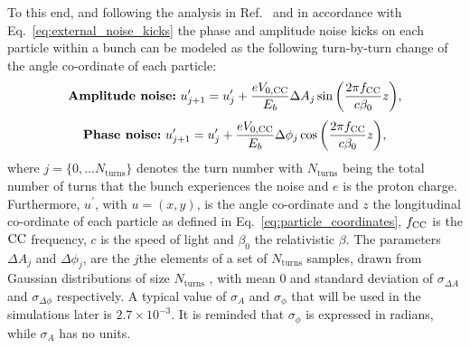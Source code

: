 To this end, and following the analysis in Ref.~\cite{PhysRevSTAB.18.101001} and in accordance with Eq.~\eqref{eq:external_noise_kicks} the phase and amplitude noise kicks on each particle within a bunch can be modeled as the following turn-by-turn change of the angle co-ordinate of each particle: %
\begin{equation}\label{eq:amplitude_noise_kick}
    \textbf{\textrm{Amplitude noise:}} \  u^\prime_{j+1} =  u^\prime_j + \frac{e {V_\mathrm{0, CC}}}{E_b} \Delta A_j \sin{\left (  \frac{2 \pi {f_\mathrm{CC}}}{c \beta_0}z   \right )},
  \end{equation}
  \begin{equation}\label{eq:phase_noise_kick}
      \textbf{\textrm{Phase noise:}} \ u^\prime_{j+1} =  u^\prime_j +  \frac{e {V_\mathrm{0, CC}}}{E_b} \Delta \phi_j  \cos{\left (  \frac{2 \pi {f_\mathrm{CC}}}{c \beta_0}z   \right )},
  \end{equation}
where $j=\{ 0,\dots N_\mathrm{turns} \}$ denotes the turn number with $N_\mathrm{turns}$ being the total number of turns that the bunch experiences the noise and $e$ is the proton charge. Furthermore, $u^\prime$, with $u=(x,y)$, is the angle co-ordinate and $z$ the longitudinal co-ordinate of each particle as defined in Eq.~\eqref{eq:particle_coordinates}, ${f_\mathrm{CC}}$ is the ${\mathrm{CC}}$ frequency, $c$ is the speed of light and $\beta_0$ the relativistic $\beta$. The parameters $\Delta A_j$ and $\Delta \phi_j$, are the $j$the elements of a set of $N_\mathrm{turns}$ samples, drawn from Gaussian distributions of size $N_\mathrm{turns}$ , with mean 0 and standard deviation of $\sigma_{\Delta A}$ and $\sigma_{\Delta \phi}$ respectively. A typical value of $\sigma_A$ and $\sigma_\phi$ that will be used in the simulations later is $2.7 \times 10^{-3}$.  It is reminded that $\sigma_\phi$ is expressed in radians, while $\sigma_A$ has no units.

